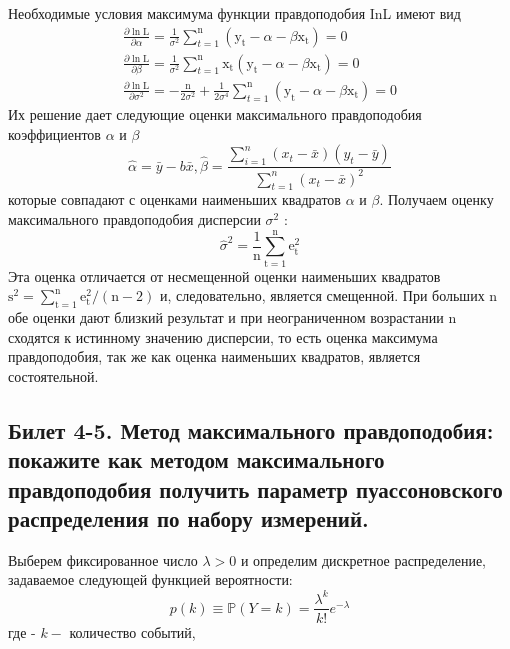 \documentclass[a4paper, 12pt]{article}
\begin{document}
	Необходимые условия максимума функции правдоподобия InL имеют вид
	$$
	\begin{array}{c}
		\frac{\partial \ln \mathrm{L}}{\partial \alpha}=\frac{1}{\sigma^{2}} \sum_{t=1}^{\mathrm{n}}\left(\mathrm{y}_{\mathrm{t}}-\alpha-\beta \mathrm{x}_{\mathrm{t}}\right)=0 \\
		\frac{\partial \ln \mathrm{L}}{\partial \beta}=\frac{1}{\sigma^{2}} \sum_{t=1}^{\mathrm{n}} \mathrm{x}_{\mathrm{t}}\left(\mathrm{y}_{\mathrm{t}}-\alpha-\beta \mathrm{x}_{\mathrm{t}}\right)=0 \\
		\frac{\partial \ln \mathrm{L}}{\partial \sigma^{2}}=-\frac{\mathrm{n}}{2 \sigma^{2}}+\frac{1}{2 \sigma^{4}} \sum_{t=1}^{\mathrm{n}}\left(\mathrm{y}_{\mathrm{t}}-\alpha-\beta \mathrm{x}_{\mathrm{t}}\right)=0
	\end{array}
	$$ Их решение дает следующие оценки максимального правдоподобия коэффициентов $\alpha$ и $\beta$
	$$
	\widehat{\alpha}=\bar{y}-b \bar{x}, \widehat{\beta}=\frac{\sum_{i=1}^{n}\left(x_{t}-\bar{x}\right)\left(y_{t}-\bar{y}\right)}{\sum_{t=1}^{n}\left(x_{t}-\bar{x}\right)^{2}}
	$$
	которые совпадают с оценками наименьших квадратов $\alpha$ и $\beta$. Получаем оценку максимального правдоподобия дисперсии $\sigma^{2}$ :
	$$
	\widehat{\sigma}^{2}=\frac{1}{\mathrm{n}} \sum_{\mathrm{t}=1}^{\mathrm{n}} \mathrm{e}_{\mathrm{t}}^{2}
	$$
	Эта оценка отличается от несмещенной оценки наименьших квадратов $\mathrm{s}^{2}=\sum_{\mathrm{t}=1}^{\mathrm{n}} \mathrm{e}_{\mathrm{t}}^{2} /(\mathrm{n}-2)$ и, следовательно, является смещенной. При больших $\mathrm{n}$ обе оценки дают близкий результат и при неограниченном возрастании n сходятся к истинному значению дисперсии, то есть оценка максимума правдоподобия, так же как оценка наименьших квадратов, является состоятельной.
	
	
	\subsection*{Билет 4-5. Метод максимального правдоподобия: покажите как методом максимального  правдоподобия получить параметр пуассоновского распределения по набору измерений.}
	Выберем фиксированное число $\lambda>0$ и определим дискретное распределение, задаваемое следующей функцией вероятности:
	$$
	p(k) \equiv \mathbb{P}(Y=k)=\frac{\lambda^{k}}{k !} e^{-\lambda}
	$$
	где
	- $k-$ количество событий,
	
\end{document}
